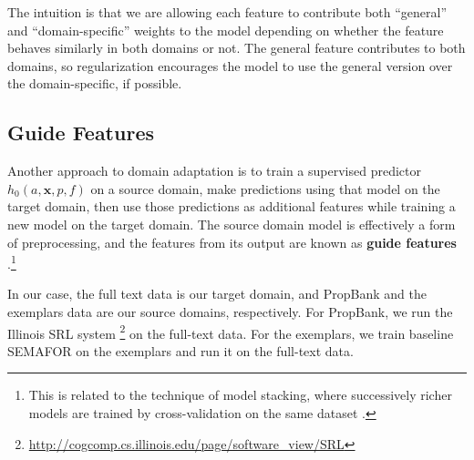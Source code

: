 \documentclass[11pt,a4paper]{article}
\newcommand{\exemplars}{\mathrm{ex}}
\newcommand{\fulltext}{\mathrm{ft}}
\newcommand{\ensuretext}[1]{#1}
\newcommand{\mkmarker}{\ensuretext{\textcolor{red}{\ensuremath{^{\textsc{M}}_{\textsc{K}}}}}}
\newcommand{\arkcomment}[3]{\ensuretext{\textcolor{#3}{[#1 #2]}}}
\newcommand{\mk}[1]{\arkcomment{\mkmarker}{#1}{red}}
\newcommand{\nascomment}[1]{\textcolor{blue}{\textbf{\small [#1 --NAS]}}}
\begin{document}
The intuition is that we are allowing
each feature to contribute both ``general'' and ``domain-specific'' weights to the model depending on whether the feature
behaves similarly in both domains or not.
The general feature contributes to both domains, so regularization encourages the model to use the general version over the domain-specific, if possible.

\subsection{Guide Features}
\label{sec:guide}

Another approach to domain adaptation %
is to train a supervised predictor $h_0(a,\mathbf{x},p,f)$ on a source domain, make predictions using that
model on the target domain, then use those predictions as additional features
while training a new model on the target domain.
The source domain model is effectively a form of preprocessing, and the features from its output are known as \textbf{guide features} \citep{johansson-13,kong-14}.\footnote{This is related to the technique
of model stacking, where successively richer models are trained by cross-validation on the same dataset 
\citep[e.g.,][]{cohen-05,nivre-08,martins-08}.}

In our case, the full text data is our target domain, and PropBank and the
exemplars data are our source domains, respectively.
For PropBank, we run the Illinois SRL system
 \citep{punyakanok-08}\footnote{\url{http://cogcomp.cs.illinois.edu/page/software_view/SRL}}
 on the full-text data.
For the exemplars, we train baseline SEMAFOR on the exemplars and run it on the
full-text data.
\end{document}
